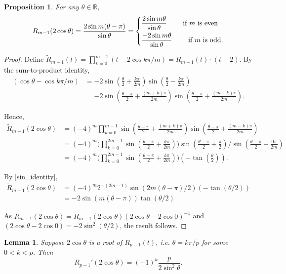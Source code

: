\documentclass[11 pt]{amsart}
\theoremstyle{plain}
\newtheorem{lemma}[thm]{Lemma}
\newtheorem{prop}[thm]{Proposition}
\theoremstyle{definition}
\theoremstyle{remark}
\def\R{\mathbb{R}}
\begin{document}
\begin{prop} \label{R_m-1}
    For any $\theta \in \R,$ $$R_{m-1}(2\cos \theta)=\frac{2\sin m (\theta-\pi)}{\sin \theta}=\begin{dcases}
        \frac{2\sin m \theta}{\sin \theta} \qquad \text{ if $m$ is even}\\
        \frac{-2\sin m \theta}{\sin \theta} \qquad \text{ if $m$ is odd}.
    \end{dcases}$$
\end{prop}

\begin{proof}
    Define $\widetilde{R}_{m-1}(t)=\prod_{k=0}^{m-1}(t-2\cos k\pi/m)=R_{m-1}(t)\cdot(t-2).$  By the sum-to-product identity, \begin{align*}
        (\cos \theta- \cos k\pi/m)&=-2\sin(\frac{\theta}{2}+\frac{k\pi}{2m})\sin (\frac{\theta}{2}-\frac{k\pi}{2m})\\
        &=-2 \sin (\frac{\theta - \pi}{2}+\frac{(m+k)\pi}{2m})\sin (\frac{\theta - \pi}{2}+\frac{(m-k)\pi}{2m}).
    \end{align*}
    
    
    Hence, \begin{align*}
    \widetilde{R}_{m-1}(2\cos \theta)&=(-4)^m \prod_{k=0}^{m-1}\sin(\frac{\theta - \pi}{2}+\frac{(m+k)\pi}{2m})\sin(\frac{\theta - \pi}{2}+\frac{(m-k)\pi}{2m})\\
    &=(-4)^m \Big(\prod_{k=0}^{2m-1}\sin(\frac{\theta - \pi}{2}+\frac{k\pi}{2m})\Big)\sin(\frac{\theta - \pi}{2}+\frac{\pi}{2}) \big/ \sin(\frac{\theta - \pi}{2}+\frac{0\pi}{2m})\\
    &=(-4)^m \big(\prod_{k=0}^{2m-1}\sin(\frac{\theta - \pi}{2}+\frac{k\pi}{2m})\Big) (-\tan(\frac{\theta}{2})).
    \end{align*}

By \eqref{sin_identity}, 
\begin{align*}
\widetilde{R}_{m-1}(2\cos \theta)&= (-4)^{m} 2^{-(2m-1)} \sin (2m(\theta-\pi)/2) (-\tan(\theta/2))\\
&=-2 \sin (m(\theta-\pi)) \tan(\theta/2)
\end{align*}


As $R_{m-1}(2\cos \theta)=\widetilde{R}_{m-1}(2\cos \theta)(2\cos \theta-2\cos 0)^{-1}$ and $(2\cos \theta-2\cos 0)=-2\sin^2(\theta/2)$, the result follows.
\end{proof}


\begin{lemma} \label{R'p-1}
    Suppose $2\cos \theta$ is a root of $R_{p-1}(t)$, i.e. $\theta=k\pi/p$ for some $0<k<p$. Then $$R_{p-1}'(2\cos \theta)=(-1)^k \frac{p}{2\sin^2 \theta}.$$
\end{lemma}
\end{document}
